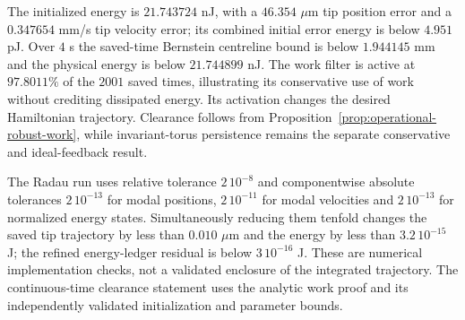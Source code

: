The initialized energy is $21.743724$ nJ, with a $46.354$ $\mu$m tip
position error and a $0.347654$ mm/s tip velocity error; its combined
initial error energy is below $4.951$ pJ. Over $4$ s the saved-time
Bernstein centreline bound is below $1.944145$ mm and the physical
energy is below $21.744899$ nJ. The work filter is active at $97.8011\%$
of the $2001$ saved times, illustrating its conservative use of work
without crediting dissipated energy. Its activation changes the desired
Hamiltonian trajectory. Clearance follows from
Proposition~\ref{prop:operational-robust-work}, while invariant-torus
persistence remains the separate conservative and ideal-feedback result.

The Radau run uses relative tolerance $2\,10^{-8}$ and componentwise
absolute tolerances $2\,10^{-13}$ for modal positions,
$2\,10^{-11}$ for modal velocities and $2\,10^{-13}$ for normalized
energy states. Simultaneously reducing them tenfold changes the saved tip
trajectory by less than $0.010$ $\mu$m and the energy by less than
$3.2\,10^{-15}$ J; the refined energy-ledger residual is below
$3\,10^{-16}$ J. These are numerical implementation checks, not a
validated enclosure of the integrated trajectory. The continuous-time
clearance statement uses the analytic work proof and its independently
validated initialization and parameter bounds.
